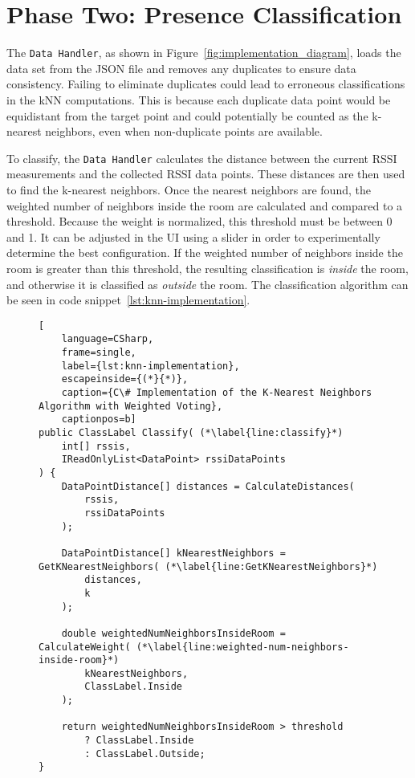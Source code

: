 \section{Phase Two: Presence Classification}\label{sec:knn_implementation}
The \texttt{Data Handler}, as shown in Figure~\ref{fig:implementation_diagram}, loads the data set from the JSON file and removes any duplicates to ensure data consistency.
Failing to eliminate duplicates could lead to erroneous classifications in the kNN computations.
This is because each duplicate data point would be equidistant from the target point and could potentially be counted as the k-nearest neighbors, even when non-duplicate points are available.

To classify, the \texttt{Data Handler} calculates the distance between the current RSSI measurements and the collected RSSI data points.
These distances are then used to find the k-nearest neighbors.
Once the nearest neighbors are found, the weighted number of neighbors inside the room are calculated and compared to a threshold.
Because the weight is normalized, this threshold must be between 0 and 1.
It can be adjusted in the UI using a slider in order to experimentally determine the best configuration.
If the weighted number of neighbors inside the room is greater than this threshold, the resulting classification is \textit{inside} the room, and otherwise it is classified as \textit{outside} the room.
The classification algorithm can be seen in code snippet~\ref{lst:knn-implementation}.

\begin{figure}[H]
\begin{lstlisting}[
	language=CSharp, 
	frame=single, 
	label={lst:knn-implementation},
	escapeinside={(*}{*)},
	caption={C\# Implementation of the K-Nearest Neighbors Algorithm with Weighted Voting}, 
	captionpos=b] 
public ClassLabel Classify( (*\label{line:classify}*)
	int[] rssis, 
	IReadOnlyList<DataPoint> rssiDataPoints
) {
	DataPointDistance[] distances = CalculateDistances(
		rssis, 
		rssiDataPoints
	);

	DataPointDistance[] kNearestNeighbors = GetKNearestNeighbors( (*\label{line:GetKNearestNeighbors}*)
		distances,
		k
	);

	double weightedNumNeighborsInsideRoom = CalculateWeight( (*\label{line:weighted-num-neighbors-inside-room}*)
		kNearestNeighbors,
		ClassLabel.Inside
	);

	return weightedNumNeighborsInsideRoom > threshold 
		? ClassLabel.Inside 
		: ClassLabel.Outside;
}
\end{lstlisting}
\end{figure}

